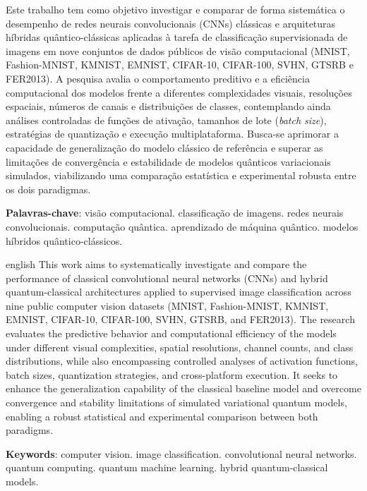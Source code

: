 \documentclass[
    12pt,
    openright,
    oneside,
    a4paper,
    english,
    brazil
]{abntex2}
\begin{document}
\frenchspacing

\pretextual
\imprimircapa
\imprimirfolhaderosto

\begin{resumo}
Este trabalho tem como objetivo investigar e comparar de forma sistemática o desempenho de redes neurais convolucionais (CNNs) clássicas e arquiteturas híbridas quântico-clássicas aplicadas à tarefa de classificação supervisionada de imagens em nove conjuntos de dados públicos de visão computacional (MNIST, Fashion-MNIST, KMNIST, EMNIST, CIFAR-10, CIFAR-100, SVHN, GTSRB e FER2013). A pesquisa avalia o comportamento preditivo e a eficiência computacional dos modelos frente a diferentes complexidades visuais, resoluções espaciais, números de canais e distribuições de classes, contemplando ainda análises controladas de funções de ativação, tamanhos de lote (\textit{batch size}), estratégias de quantização e execução multiplataforma. Busca-se aprimorar a capacidade de generalização do modelo clássico de referência e superar as limitações de convergência e estabilidade de modelos quânticos variacionais simulados, viabilizando uma comparação estatística e experimental robusta entre os dois paradigmas.

\vspace{\onelineskip}
\noindent
\textbf{Palavras-chave}: visão computacional. classificação de imagens. redes neurais convolucionais. computação quântica. aprendizado de máquina quântico. modelos híbridos quântico-clássicos.
\end{resumo}

\begin{resumo}[Abstract]
\begin{otherlanguage*}{english}
This work aims to systematically investigate and compare the performance of classical convolutional neural networks (CNNs) and hybrid quantum-classical architectures applied to supervised image classification across nine public computer vision datasets (MNIST, Fashion-MNIST, KMNIST, EMNIST, CIFAR-10, CIFAR-100, SVHN, GTSRB, and FER2013). The research evaluates the predictive behavior and computational efficiency of the models under different visual complexities, spatial resolutions, channel counts, and class distributions, while also encompassing controlled analyses of activation functions, batch sizes, quantization strategies, and cross-platform execution. It seeks to enhance the generalization capability of the classical baseline model and overcome convergence and stability limitations of simulated variational quantum models, enabling a robust statistical and experimental comparison between both paradigms.

\vspace{\onelineskip}
\noindent
\textbf{Keywords}: computer vision. image classification. convolutional neural networks. quantum computing. quantum machine learning. hybrid quantum-classical models.
\end{otherlanguage*}
\end{resumo}
\end{document}
